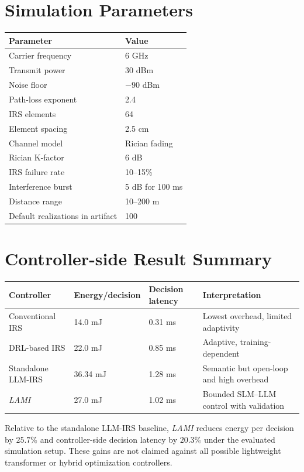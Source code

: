 \documentclass[11pt]{article}
\begin{document}
\section{Simulation Parameters}

\begin{center}
\begin{tabular}{ll}
\toprule
Parameter & Value \\
\midrule
Carrier frequency & 6 GHz \\
Transmit power & 30 dBm \\
Noise floor & $-90$ dBm \\
Path-loss exponent & 2.4 \\
IRS elements & 64 \\
Element spacing & 2.5 cm \\
Channel model & Rician fading \\
Rician K-factor & 6 dB \\
IRS failure rate & 10--15\% \\
Interference burst & 5 dB for 100 ms \\
Distance range & 10--200 m \\
Default realizations in artifact & 100 \\
\bottomrule
\end{tabular}
\end{center}

\section{Controller-side Result Summary}

\begin{center}
\begin{tabular}{llll}
\toprule
Controller & Energy/decision & Decision latency & Interpretation \\
\midrule
Conventional IRS & 14.0 mJ & 0.31 ms & Lowest overhead, limited adaptivity \\
DRL-based IRS & 22.0 mJ & 0.85 ms & Adaptive, training-dependent \\
Standalone LLM-IRS & 36.34 mJ & 1.28 ms & Semantic but open-loop and high overhead \\
\textit{LAMI} & 27.0 mJ & 1.02 ms & Bounded SLM--LLM control with validation \\
\bottomrule
\end{tabular}
\end{center}

Relative to the standalone LLM-IRS baseline, \textit{LAMI} reduces energy per decision by $25.7\%$ and controller-side decision latency by $20.3\%$ under the evaluated simulation setup. These gains are not claimed against all possible lightweight transformer or hybrid optimization controllers.
\end{document}
